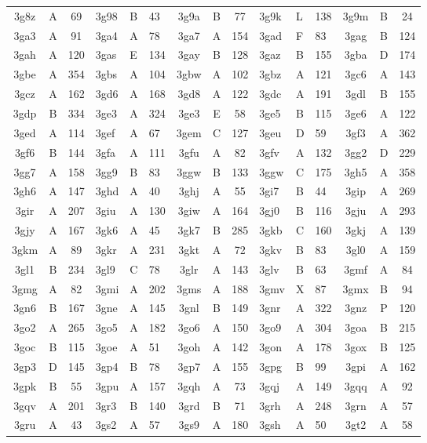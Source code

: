 \begin{longtable}{|c|c|c| a|a|a| c|c|c| a|a|a| c|c|c|}
3g8z & A & 69 & 3g98 & B & 43 & 3g9a & B & 77 & 3g9k & L & 138 & 3g9m & B & 24\\
3ga3 & A & 91 & 3ga4 & A & 78 & 3ga7 & A & 154 & 3gad & F & 83 & 3gag & B & 124\\
3gah & A & 120 & 3gas & E & 134 & 3gay & B & 128 & 3gaz & B & 155 & 3gba & D & 174\\
3gbe & A & 354 & 3gbs & A & 104 & 3gbw & A & 102 & 3gbz & A & 121 & 3gc6 & A & 143\\
3gcz & A & 162 & 3gd6 & A & 168 & 3gd8 & A & 122 & 3gdc & A & 191 & 3gdl & B & 155\\
3gdp & B & 334 & 3ge3 & A & 324 & 3ge3 & E & 58 & 3ge5 & B & 115 & 3ge6 & A & 122\\
3ged & A & 114 & 3gef & A & 67 & 3gem & C & 127 & 3geu & D & 59 & 3gf3 & A & 362\\
3gf6 & B & 144 & 3gfa & A & 111 & 3gfu & A & 82 & 3gfv & A & 132 & 3gg2 & D & 229\\
3gg7 & A & 158 & 3gg9 & B & 83 & 3ggw & B & 133 & 3ggw & C & 175 & 3gh5 & A & 358\\
3gh6 & A & 147 & 3ghd & A & 40 & 3ghj & A & 55 & 3gi7 & B & 44 & 3gip & A & 269\\
3gir & A & 207 & 3giu & A & 130 & 3giw & A & 164 & 3gj0 & B & 116 & 3gju & A & 293\\
3gjy & A & 167 & 3gk6 & A & 45 & 3gk7 & B & 285 & 3gkb & C & 160 & 3gkj & A & 139\\
3gkm & A & 89 & 3gkr & A & 231 & 3gkt & A & 72 & 3gkv & B & 83 & 3gl0 & A & 159\\
3gl1 & B & 234 & 3gl9 & C & 78 & 3glr & A & 143 & 3glv & B & 63 & 3gmf & A & 84\\
3gmg & A & 82 & 3gmi & A & 202 & 3gms & A & 188 & 3gmv & X & 87 & 3gmx & B & 94\\
3gn6 & B & 167 & 3gne & A & 145 & 3gnl & B & 149 & 3gnr & A & 322 & 3gnz & P & 120\\
3go2 & A & 265 & 3go5 & A & 182 & 3go6 & A & 150 & 3go9 & A & 304 & 3goa & B & 215\\
3goc & B & 115 & 3goe & A & 51 & 3goh & A & 142 & 3gon & A & 178 & 3gox & B & 125\\
3gp3 & D & 145 & 3gp4 & B & 78 & 3gp7 & A & 155 & 3gpg & B & 99 & 3gpi & A & 162\\
3gpk & B & 55 & 3gpu & A & 157 & 3gqh & A & 73 & 3gqj & A & 149 & 3gqq & A & 92\\
3gqv & A & 201 & 3gr3 & B & 140 & 3grd & B & 71 & 3grh & A & 248 & 3grn & A & 57\\
3gru & A & 43 & 3gs2 & A & 57 & 3gs9 & A & 180 & 3gsh & A & 50 & 3gt2 & A & 58\\

\end{longtable}
